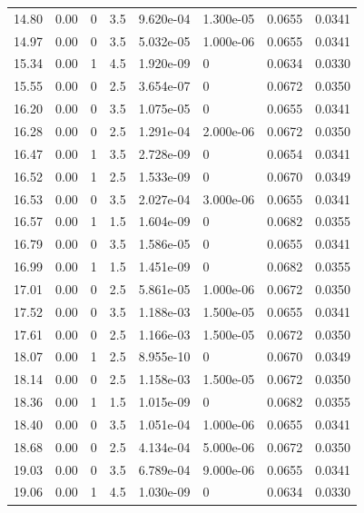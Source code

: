 \documentclass[preview]{standalone}
\begin{document}
{{{\begin{tabular}{L{1.2cm}C{1.2cm} C{0.3cm}C{0.5cm} C{1.4cm}C{1.4cm} C{1.4cm}C{1.4cm}}
  14.80  &  0.00  & 0     & 3.5 &  9.620e-04  & 1.300e-05  & 0.0655 &  0.0341   \\ 
  14.97  &  0.00  & 0     & 3.5 &  5.032e-05  & 1.000e-06  & 0.0655 &  0.0341   \\ 
  15.34  &  0.00  & 1     & 4.5 &  1.920e-09  & 0  & 0.0634 &  0.0330   \\ 
  15.55  &  0.00  & 0     & 2.5 &  3.654e-07  & 0  & 0.0672 &  0.0350   \\ 
  16.20  &  0.00  & 0     & 3.5 &  1.075e-05  & 0  & 0.0655 &  0.0341   \\ 
  16.28  &  0.00  & 0     & 2.5 &  1.291e-04  & 2.000e-06  & 0.0672 &  0.0350   \\ 
  16.47  &  0.00  & 1     & 3.5 &  2.728e-09  & 0  & 0.0654 &  0.0341   \\ 
  16.52  &  0.00  & 1     & 2.5 &  1.533e-09  & 0  & 0.0670 &  0.0349   \\ 
  16.53  &  0.00  & 0     & 3.5 &  2.027e-04  & 3.000e-06  & 0.0655 &  0.0341   \\ 
  16.57  &  0.00  & 1     & 1.5 &  1.604e-09  & 0  & 0.0682 &  0.0355   \\ 
  16.79  &  0.00  & 0     & 3.5 &  1.586e-05  & 0  & 0.0655 &  0.0341   \\ 
  16.99  &  0.00  & 1     & 1.5 &  1.451e-09  & 0  & 0.0682 &  0.0355   \\ 
  17.01  &  0.00  & 0     & 2.5 &  5.861e-05  & 1.000e-06  & 0.0672 &  0.0350   \\ 
  17.52  &  0.00  & 0     & 3.5 &  1.188e-03  & 1.500e-05  & 0.0655 &  0.0341   \\ 
  17.61  &  0.00  & 0     & 2.5 &  1.166e-03  & 1.500e-05  & 0.0672 &  0.0350   \\ 
  18.07  &  0.00  & 1     & 2.5 &  8.955e-10  & 0  & 0.0670 &  0.0349   \\ 
  18.14  &  0.00  & 0     & 2.5 &  1.158e-03  & 1.500e-05  & 0.0672 &  0.0350   \\ 
  18.36  &  0.00  & 1     & 1.5 &  1.015e-09  & 0  & 0.0682 &  0.0355   \\ 
  18.40  &  0.00  & 0     & 3.5 &  1.051e-04  & 1.000e-06  & 0.0655 &  0.0341   \\ 
  18.68  &  0.00  & 0     & 2.5 &  4.134e-04  & 5.000e-06  & 0.0672 &  0.0350   \\ 
  19.03  &  0.00  & 0     & 3.5 &  6.789e-04  & 9.000e-06  & 0.0655 &  0.0341   \\ 
  19.06  &  0.00  & 1     & 4.5 &  1.030e-09  & 0  & 0.0634 &  0.0330   \\ 

\end{tabular}}}}
\end{document}
